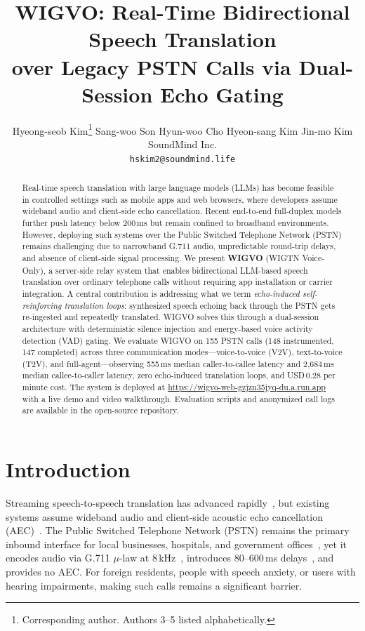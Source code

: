 \documentclass[11pt]{article}
\title{WIGVO: Real-Time Bidirectional Speech Translation\\over Legacy PSTN Calls via Dual-Session Echo Gating}
\author{
  Hyeong-seob Kim\thanks{Corresponding author. Authors 3--5 listed alphabetically.} \quad
  Sang-woo Son \quad
  Hyun-woo Cho \quad
  Hyeon-sang Kim \quad
  Jin-mo Kim \\
  SoundMind Inc. \\
  \texttt{hskim2@soundmind.life}
}
\begin{document}
\maketitle

\begin{abstract}
Real-time speech translation with large language models (LLMs) has become feasible in controlled settings such as mobile apps and web browsers, where developers assume wideband audio and client-side echo cancellation. Recent end-to-end full-duplex models further push latency below 200\,ms but remain confined to broadband environments. However, deploying such systems over the Public Switched Telephone Network (PSTN) remains challenging due to narrowband G.711 audio, unpredictable round-trip delays, and absence of client-side signal processing. We present \textbf{WIGVO} (WIGTN Voice-Only), a server-side relay system that enables bidirectional LLM-based speech translation over ordinary telephone calls without requiring app installation or carrier integration. A central contribution is addressing what we term \emph{echo-induced self-reinforcing translation loops}: synthesized speech echoing back through the PSTN gets re-ingested and repeatedly translated. WIGVO solves this through a dual-session architecture with deterministic silence injection and energy-based voice activity detection (VAD) gating. We evaluate WIGVO on 155 PSTN calls (148 instrumented, 147 completed) across three communication modes---voice-to-voice (V2V), text-to-voice (T2V), and full-agent---observing 555\,ms median caller-to-callee latency and 2{,}684\,ms median callee-to-caller latency, zero echo-induced translation loops, and USD\,0.28 per minute cost. The system is deployed at \url{https://wigvo-web-gzjzn35jyq-du.a.run.app} with a live demo and video walkthrough. Evaluation scripts and anonymized call logs are available in the open-source repository.
\end{abstract}

\section{Introduction}

Streaming speech-to-speech translation has advanced rapidly~\citep{seamless_streaming_2023,openai_realtime_api_2024}, but existing systems assume wideband audio and client-side acoustic echo cancellation (AEC)~\citep{itu_g168_2015}. The Public Switched Telephone Network (PSTN) remains the primary inbound interface for local businesses, hospitals, and government offices~\citep{itu_pstn_overview_2020}, yet it encodes audio via G.711 $\mu$-law at 8\,kHz~\citep{itu_g711_1988}, introduces 80--600\,ms delays~\citep{itu_g114_2003}, and provides no AEC. For foreign residents, people with speech anxiety, or users with hearing impairments, making such calls remains a significant barrier.
\end{document}
